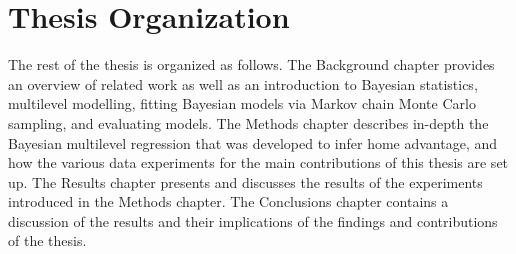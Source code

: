 \section{Thesis Organization}

The rest of the thesis is organized as follows. The Background chapter provides an overview of related work as well as an introduction to Bayesian statistics, multilevel modelling, fitting Bayesian models via Markov chain Monte Carlo sampling, and evaluating models. The Methods chapter describes in-depth the Bayesian multilevel regression that was developed to infer home advantage, and how the various data experiments for the main contributions of this thesis are set up. The Results chapter presents and discusses the results of the experiments introduced in the Methods chapter. The Conclusions chapter contains a discussion of the results and their implications of the findings and contributions of the thesis.
